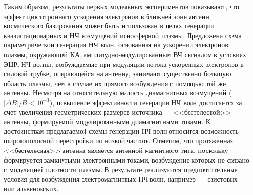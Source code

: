\documentclass[autoref,10pt]{disser}
\begin{document}
Таким образом, результаты первых модельных экспериментов показывают, что эффект циклотронного ускорения электронов в ближней зоне антенн космического базирования может быть использован в целях генерации квазистационарных и НЧ возмущений ионосферной плазмы. Предложена схема параметрической генерации НЧ волн, основанная на ускорении электронов плазмы, окружающей КА, амплитудно-мо\-ду\-ли\-ро\-ван\-ным ВЧ сигналом в условиях ЭЦР. НЧ волны, возбуждаемые при модуляции потока ускоренных электронов в силовой трубке, опирающейся на антенну, занимают существенно большую область плазмы, чем в случае их прямого возбуждения с помощью той же антенны. Несмотря на относительную малость диамагнитных возмущений ($|\Delta{}B|/B < 10^{-3}$), повышение эффективности генерации НЧ волн достигается за счет увеличения геометрических размеров источника --- <<бестелесной>> антенны, формируемой модулированными диамагнитными токами. К достоинствам предлагаемой схемы генерации НЧ волн относится возможность широкополосной перестройки по низкой частоте. Отметим, что протяженная <<бестелесная>> антенна является антенной магнитного типа, поскольку формируется замкнутыми электронными токами, возбуждение которых не связано с модуляцией плотности плазмы. В результате реализуются предпочтительные условия для возбуждения электромагнитных НЧ волн, например --- свистовых или альвеновских.
\end{document}
